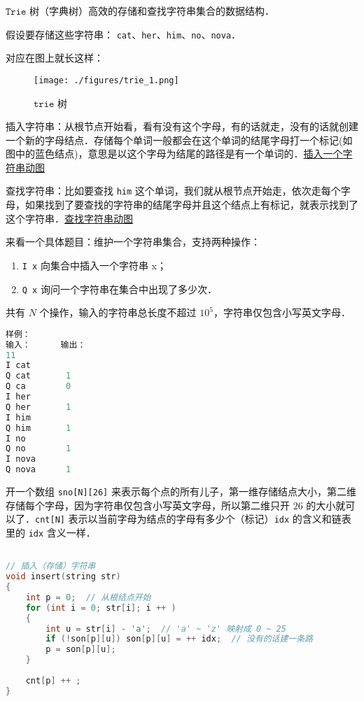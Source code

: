
$\mathtt{Trie}$ 树（字典树）高效的存储和查找字符串集合的数据结构．

假设要存储这些字符串：
\verb|cat|、\verb|her|、\verb|him|、\verb|no|、\verb|nova|．

对应在图上就长这样：\begin{figure}[ht]
\centering
\texttt{[image: ./figures/trie\_1.png]}
\caption{$\mathtt{trie}$ 树} \label{trie_fig1}
\end{figure}

插入字符串：从根节点开始看，看有没有这个字母，有的话就走，没有的话就创建一个新的字母结点．存储每个单词一般都会在这个单词的结尾字母打一个标记(如图中的蓝色结点)，意思是以这个字母为结尾的路径是有一个单词的．\href{https://pic2.zhimg.com/v2-cb9b476f3856b7ae68a00af6911c07a9_b.gif}{插入一个字符串动图}

查找字符串：比如要查找 \verb|him| 这个单词，我们就从根节点开始走，依次走每个字母，如果找到了要查找的字符串的结尾字母并且这个结点上有标记，就表示找到了这个字符串．\href{https://pic2.zhimg.com/v2-98c24afcfc74582fdc54c7381d29d639_b.gif}{查找字符串动图}

来看一个具体题目：维护一个字符串集合，支持两种操作：

\begin{enumerate}
\item \verb|I x| 向集合中插入一个字符串 x；
\item \verb|Q x| 询问一个字符串在集合中出现了多少次．
\end{enumerate}
共有 $N$ 个操作，输入的字符串总长度不超过 $10^5$，字符串仅包含小写英文字母．

\begin{lstlisting}[language=cpp]
样例：
输入：      输出：
11
I cat       
Q cat       1
Q ca        0
I her
Q her       1
I him
Q him       1
I no 
Q no        1
I nova
Q nova      1
\end{lstlisting}

开一个数组 \verb|sno[N][26]| 来表示每个点的所有儿子，第一维存储结点大小，第二维存储每个字母，因为字符串仅包含小写英文字母，所以第二维只开 $26$ 的大小就可以了．\verb|cnt[N]| 表示以当前字母为结点的字母有多少个（标记）\verb|idx| 的含义和链表里的 \verb|idx| 含义一样．

\begin{lstlisting}[language=cpp]

// 插入（存储）字符串
void insert(string str)
{
    int p = 0;  // 从根结点开始
    for (int i = 0; str[i]; i ++ )
    {
        int u = str[i] - 'a';  // 'a' ~ 'z' 映射成 0 ~ 25
        if (!son[p][u]) son[p][u] = ++ idx;  // 没有的话建一条路
        p = son[p][u];
    }
    
    cnt[p] ++ ;
}
\end{lstlisting}